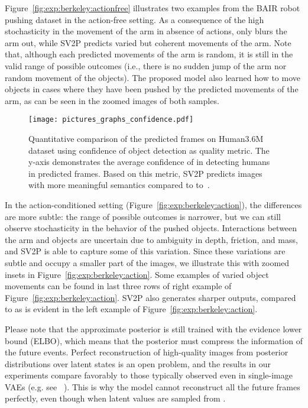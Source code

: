 \documentclass{article} \usepackage{iclr2018_conference,times}
\begin{document}
Figure~\ref{fig:exp:berkeley:actionfree} illustrates two examples from the BAIR robot pushing dataset in the action-free setting. As a consequence of the high stochasticity in the movement of the arm in absence of actions, \cite{finn2016unsupervised} only blurs the arm out, while SV2P predicts varied but coherent movements of the arm. Note that, although each predicted movements of the arm is random, it is still in the valid range of possible outcomes (i.e., there is no sudden jump of the arm nor random movement of the objects). The proposed model also learned how to move objects in cases where they have been pushed by the predicted movements of the arm, as can be seen in the zoomed images of both samples.


\begin{wrapfigure}{R}{0.48\textwidth}
  \centering
  \vspace{-0.7cm}
  \texttt{[image: pictures\_graphs\_confidence.pdf]}
  \vspace{-0.2cm}
  \caption{Quantitative comparison of the predicted frames on Human3.6M dataset using confidence of object detection as quality metric. The y-axis demonstrates the average confidence of \cite{huang2016speed} in detecting humans in predicted frames. Based on this metric, SV2P predicts images with more meaningful semantics compared to to~\cite{finn2016unsupervised}.}
\label{fig:confidence}
\end{wrapfigure} 
In the action-conditioned setting (Figure~\ref{fig:exp:berkeley:action}), the differences are more subtle: the range of possible outcomes is narrower, but we can still observe stochasticity in the behavior of the pushed objects. Interactions between the arm and objects are uncertain due to ambiguity in depth, friction, and mass, and SV2P is able to capture some of this variation. Since these variations are subtle and occupy a smaller part of the images, we illustrate this with zoomed insets in Figure~\ref{fig:exp:berkeley:action}. Some examples of varied object movements can be found in last three rows of right example of Figure~\ref{fig:exp:berkeley:action}. SV2P also generates sharper outputs, compared to \cite{finn2016unsupervised} as is evident in the left example of Figure~\ref{fig:exp:berkeley:action}.

Please note that the approximate posterior  is still trained with the evidence lower bound (ELBO), which means that the posterior must compress the information of the future events. Perfect reconstruction of high-quality images from posterior distributions over latent states is an open problem, and the results in our experiments compare favorably to those typically observed even in single-image VAEs (e.g. see ~\cite{xue2016visual}). This is why the model cannot reconstruct all the future frames perfectly, even though when latent values are sampled from .
\end{document}
